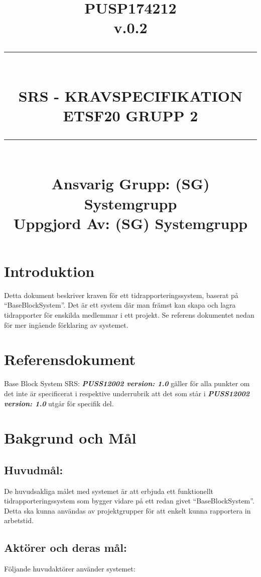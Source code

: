 \documentclass[paper=a4, fontsize=11pt,twoside]{article}
\title{
\documentNumber{#1}																						
\documentVersion{#2}																				
\HRule{0.5pt} \\ %
\LARGE \textbf{\uppercase{#3}} \\
\large \textbf{\uppercase{ETSF20 Grupp 2}} 
\HRule{2pt} \\ [1.5cm]    
\normalsize            
\documentResponsible{#4} \\ 
\documentCreator{#4}  
}
\newcommand{\HRule}[1]{\rule{\linewidth}{#1}}
\newcommand{\documentNumber}[1]{\centering PUSP1742#1 \\[1.0cm]}
\newcommand{\documentVersion}[1]{\centering \small{v.#1} \\[1.0cm]}
\newcommand{\documentResponsible}[1]{\centering  Ansvarig Grupp: #1}
\newcommand{\documentCreator}[1]{\centering Uppgjord Av: #1}
\newcommand{\grouptitlepage}[4]{ 
\title{
\documentNumber{#1}																						
\documentVersion{#2}																				
\HRule{0.5pt} \\ %
\LARGE \textbf{\uppercase{#3}} \\
\large \textbf{\uppercase{ETSF20 Grupp 2}} 
\HRule{2pt} \\ [1.5cm]    
\normalsize            
\documentResponsible{#4} \\ 
\documentCreator{#4}  
}																							
\maketitle																							
\thispagestyle{empty} 																	\newpage 				
 
}
\begin{document}
\grouptitlepage
{12}
{0.2}
{SRS - Kravspecifikation}
{(SG) Systemgrupp}	
\tableofcontents
\section{Introduktion}
Detta dokument beskriver kraven för ett tidrapporteringssystem, baserat på “BaseBlockSystem”. Det är ett system där man främst kan skapa och lagra tidrapporter för enskilda medlemmar i ett projekt. Se referens dokumentet nedan för mer ingående förklaring av systemet.
\section{Referensdokument}
Base Block System SRS: \textbf{\textit{PUSS12002 version: 1.0}}  gäller för alla punkter	 om det inte är specificerat i respektive underrubrik att det som står i \textbf{\textit{PUSS12002 version: 1.0}}  utgår för specifik del.

\newpage
\section{Bakgrund och Mål}
\subsection{Huvudmål:}
De huvudsakliga målet med systemet är att erbjuda ett funktionellt tidrapporteringssystem som bygger vidare på ett redan givet “BaseBlockSystem”. Detta ska kunna användas av projektgrupper för att enkelt kunna rapportera in arbetstid.
\subsection{Aktörer och deras mål:}
Följande huvudaktörer använder systemet:
\end{document}
